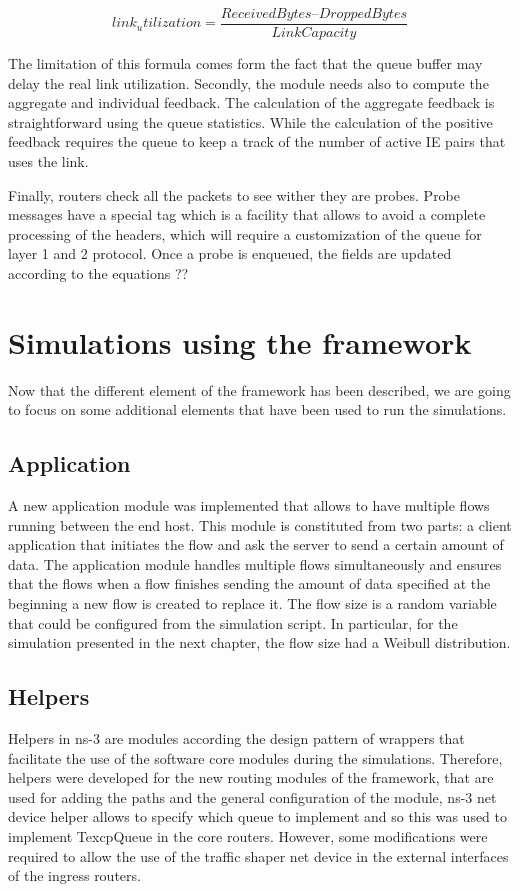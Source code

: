 \begin{equation}
link_utilization = \frac{ReceivedBytes – DroppedBytes}{LinkCapacity}
\end{equation}

The limitation of this formula comes form the fact that the queue buffer may delay the real link utilization.
Secondly, the module needs also to compute the aggregate and individual feedback. The calculation of the aggregate feedback is straightforward using the queue statistics. While the calculation of the positive feedback requires the queue to keep a track of the number of active IE pairs that uses the link.

Finally, routers check all the packets to see wither they are probes. Probe messages have a special tag which is a facility that allows to avoid a complete processing  of the headers, which will require a customization of the queue for layer 1 and 2 protocol. Once a probe is enqueued, the fields are updated according to the equations ??

\section{Simulations using the framework}
Now that the different element of the framework has been described, we are going to focus on some additional elements that have been used to run the simulations.

\subsection{Application}
A new application module was implemented that allows to have multiple flows running between the end host. This module is constituted from two parts: a client application that initiates the flow and ask the server to send a certain amount of data. The application module handles multiple flows simultaneously and ensures that the flows when a flow finishes sending the amount of data specified at the beginning a new flow is created to replace it. The flow size is a random variable that could  be configured from the simulation script. In particular, for the simulation presented in the next chapter, the flow size had  a Weibull distribution.

\subsection{Helpers}
Helpers in ns-3 are modules according the design pattern of wrappers that facilitate the use of the software core modules during the simulations. Therefore, helpers were developed for the new routing modules of the framework, that are used for adding the paths and the general configuration of the module, ns-3 net device helper allows to specify which queue to implement and so this was used to implement TexcpQueue in the core routers. However, some modifications were required to allow the use of the traffic shaper net device in the external interfaces of the ingress routers. 

